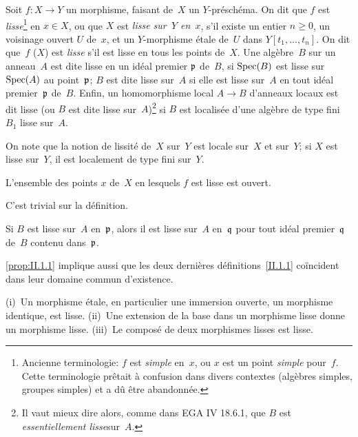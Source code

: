 \begin{definition}
\label{II.1.1}
Soit $f\colon X \to Y$ un morphisme, faisant de~$X$ un
$Y$-pr\'esch\'ema. On dit que $f$ est
\emph{lisse}\footnote{Ancienne terminologie: $f$ est \emph{simple}
en~$x$, ou $x$ est un point \emph{simple} pour~$f$. Cette
terminologie pr\^etait \`a confusion dans divers contextes
(alg\`ebres simples, groupes simples) et a d\^u \^etre
abandonn\'ee.}
en $x \in X$, ou que $X$ est \emph{lisse sur~$Y$ en~$x$}, s'il existe
un entier $n \geq 0$, un voisinage ouvert $U$ de~$x$, et un
$Y$-morphisme \'etale de~$U$ dans $Y[t_1,\dots,t_n]$. On dit
que~$f$
(\resp $X$)
est \emph{lisse} s'il est lisse en tous les points de~$X$. Une
alg\`ebre~$B$ sur un anneau~$A$ est dite lisse en un id\'eal
premier $\mathfrak{p}$ de~$B$, si $\operatorname{Spec}(B)$ est lisse sur~$\operatorname{Spec}(A)$
au
point~$\mathfrak{p}$;
$B$ est dite lisse sur~$A$ si elle est lisse sur~$A$ en tout id\'eal
premier~$\mathfrak{p}$ de~$B$. Enfin, un homomorphisme local $A \to B$
d'anneaux locaux est dit lisse (ou $B$ est dite lisse sur~$A$)\footnote{Il vaut mieux dire alors, comme dans EGA IV 18.6.1, que $B$
est \og \emph{essentiellement lisse}\fg sur~$A$.}
si $B$ est localis\'ee d'une alg\`ebre de type fini $B_1$ lisse
sur~$A$.
\end{definition}

On note que la notion de lissit\'e de~$X$ sur~$Y$ est locale sur~$X$
et sur~$Y$; si $X$ est lisse sur~$Y$, il est localement de type fini
sur~$Y$.

\setcounter{subsection}{0}
\begin{proposition}
\label{prop:II.1.1}
L'ensemble des points $x$ de~$X$ en lesquels $f$ est lisse est ouvert.
\end{proposition}

C'est trivial sur la d\'efinition.

\begin{corollaire}
\label{II.1.2}
Si $B$ est lisse sur~$A$ en~$\mathfrak{p}$, alors il est lisse sur~$A$
en~$\mathfrak{q}$ pour tout id\'eal premier~$\mathfrak{q}$ de~$B$ contenu
dans~$\mathfrak{p}$.
\end{corollaire}

\ref{prop:II.1.1} implique aussi que les deux derni\`eres
d\'efinitions~\ref{II.1.1} co\"incident dans leur domaine commun
d'existence.

\begin{proposition}
\label{II.1.3}
\textup{(i)}~Un morphisme \'etale, en particulier une immersion
ouverte, un morphisme identique, est lisse. \textup{(ii)}~Une extension
de la base dans un morphisme lisse donne un morphisme
lisse. \textup{(iii)}~Le compos\'e de deux morphismes lisses est
lisse.
\end{proposition}

